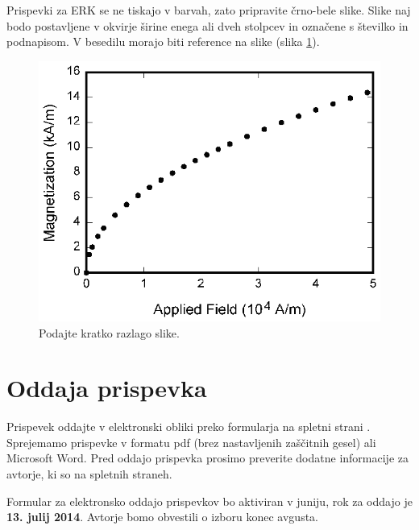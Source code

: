 \documentclass[a4paper]{article}
\begin{document}
Prispevki za ERK se ne tiskajo v barvah, zato pripravite črno-bele slike. Slike naj bodo postavljene v okvirje širine enega ali dveh stolpcev in označene s številko in podnapisom. V besedilu morajo biti reference na slike (slika \ref{slika}).

\begin{figure}[!htb]
    \begin{center}
        \includegraphics[scale=1]{field1.eps}
        \caption{Podajte kratko razlago slike.} \label{slika}
    \end{center}
\end{figure}

\section{Oddaja prispevka}

Prispevek oddajte v elektronski obliki preko formularja na spletni strani \cite{ERK}. Sprejemamo prispevke v formatu pdf (brez nastavljenih zaščitnih gesel) ali Microsoft Word. Pred oddajo prispevka prosimo preverite dodatne informacije za avtorje, ki so na spletnih straneh. 

Formular za elektronsko oddajo prispevkov bo aktiviran v juniju, rok za oddajo je \textbf{13. julij 2014}. Avtorje bomo obvestili o izboru konec avgusta.
\end{document}
